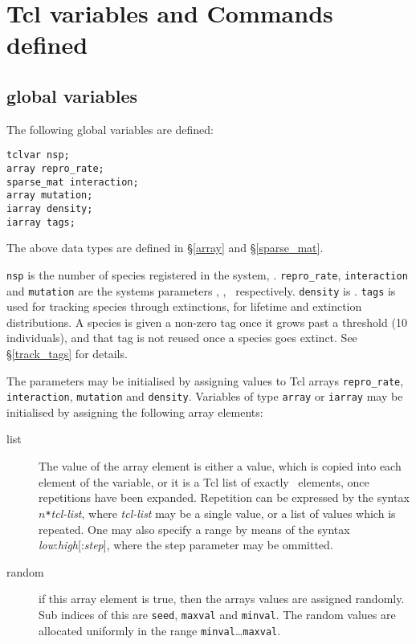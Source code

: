 \section{Tcl variables and Commands defined}

\subsection{global variables}\label{globvar}
The following global variables are defined:

\begin{verbatim}
tclvar nsp;
array repro_rate;
sparse_mat interaction;
array mutation;
iarray density;
iarray tags;
\end{verbatim}
The above data types are defined in \S\ref{array} and \S\ref{sparse_mat}.

\verb|nsp| is the number of species registered in the system, \nsp.
\verb|repro_rate|, \verb|interaction| and \verb|mutation| are the
systems parameters \br, \bbeta, \bmu\ respectively. \verb|density|
is \bn. \verb|tags| is used for tracking species through
extinctions, for lifetime and extinction distributions. A species is
given a non-zero tag once it grows past a threshold (10 individuals),
and that tag is not reused once a species goes extinct. See
\S\ref{track_tags} for details.

The parameters may be initialised by assigning values to Tcl arrays
\verb|repro_rate|, \verb|interaction|,  \verb|mutation| and
\verb|density|. Variables of type \verb|array| or \verb|iarray| may be
initialised by assigning the following array elements:
\begin{description}
\item[list] The value of the array element is either a value, which is
copied into each element of the variable, or it is a Tcl list of
exactly \nsp\ elements, once repetitions have been expanded.
Repetition can be expressed by the syntax $n$\verb|*|{\em tcl-list},
where {\em tcl-list} may be a single value, or a list of values which
is repeated. One may also specify a range by means of the syntax {\em
low}:{\em high}[:{\em step}], where the step parameter may be
ommitted.
\item[random] if this array element is true, then the arrays values
are assigned randomly. Sub indices of this are \verb|seed|,
\verb|maxval| and \verb|minval|. The random values are allocated
uniformly in the range \verb|minval|\ldots\verb|maxval|.
\end{description}


